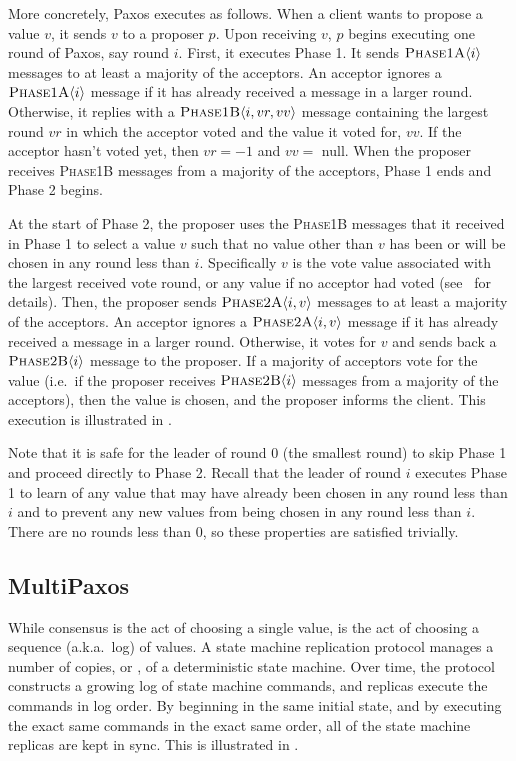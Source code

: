 More concretely, Paxos executes as follows. When a client wants to propose a
value $v$, it sends $v$ to a proposer $p$. Upon receiving $v$, $p$ begins
executing one round of Paxos, say round $i$. First, it executes Phase 1. It
sends $\textsc{Phase1A}\langle{i}\rangle$ messages to at least a majority of the acceptors. An
acceptor ignores a $\textsc{Phase1A}\langle{i}\rangle$ message if it has already received a message
in a larger round. Otherwise, it replies with a $\textsc{Phase1B}\langle{i, vr, vv}\rangle$ message
containing the largest round $vr$ in which the acceptor voted and the value it
voted for, $vv$. If the acceptor hasn't voted yet, then $vr = -1$ and $vv = $
\textsf{null}. When the proposer receives \textsc{Phase1B} messages from a
majority of the acceptors, Phase 1 ends and Phase 2 begins.

At the start of Phase 2, the proposer uses the \textsc{Phase1B} messages that
it received in Phase 1 to select a value $v$ such that no value other than $v$
has been or will be chosen in any round less than $i$. Specifically $v$ is the
vote value associated with the largest received vote round, or any value if no
acceptor had voted (see~\cite{lamport2001paxos} for details). Then, the
proposer sends $\textsc{Phase2A}\langle{i, v}\rangle$ messages to at least a majority of the
acceptors. An acceptor ignores a $\textsc{Phase2A}\langle{i, v}\rangle$ message if it has already
received a message in a larger round. Otherwise, it votes for $v$ and sends
back a $\textsc{Phase2B}\langle{i}\rangle$ message to the proposer. If a majority of acceptors vote
for the value (i.e.\ if the proposer receives $\textsc{Phase2B}\langle{i}\rangle$ messages from a
majority of the acceptors), then the value is chosen, and the proposer informs
the client. This execution is illustrated in .

Note that it is safe for the leader of round $0$ (the smallest round) to skip
Phase 1 and proceed directly to Phase 2. Recall that the leader of round $i$
executes Phase 1 to learn of any value that may have already been chosen in any
round less than $i$ and to prevent any new values from being chosen in any
round less than $i$. There are no rounds less than $0$, so these properties are
satisfied trivially.

\subsection{MultiPaxos}
While consensus is the act of choosing a single value,  is the act of choosing a sequence (a.k.a.\ log) of values. A state
machine replication protocol manages a number of copies, or ,
of a deterministic state machine. Over time, the protocol constructs a growing
log of state machine commands, and replicas execute the commands in log order.
By beginning in the same initial state, and by executing the exact same
commands in the exact same order, all of the state machine replicas are kept in
sync. This is illustrated in .

